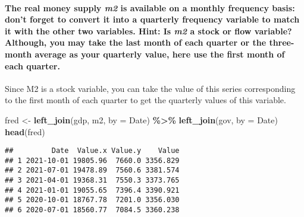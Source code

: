 \documentclass[
]{article}
\newenvironment{Shaded}{\begin{snugshade}}{\end{snugshade}}
\newcommand{\AttributeTok}[1]{\textcolor[rgb]{0.13,0.29,0.53}{#1}}
\newcommand{\FunctionTok}[1]{\textcolor[rgb]{0.13,0.29,0.53}{\textbf{#1}}}
\newcommand{\NormalTok}[1]{#1}
\newcommand{\OtherTok}[1]{\textcolor[rgb]{0.56,0.35,0.01}{#1}}
\newcommand{\SpecialCharTok}[1]{\textcolor[rgb]{0.81,0.36,0.00}{\textbf{#1}}}
\newcommand{\StringTok}[1]{\textcolor[rgb]{0.31,0.60,0.02}{#1}}
\begin{document}
\hypertarget{the-real-money-supply-m2-is-available-on-a-monthly-frequency-basis-dont-forget-to-convert-it-into-a-quarterly-frequency-variable-to-match-it-with-the-other-two-variables.-hint-is-m2-a-stock-or-flow-variable-although-you-may-take-the-last-month-of-each-quarter-or-the-three-month-average-as-your-quarterly-value-here-use-the-first-month-of-each-quarter.}{%
\paragraph{\texorpdfstring{The real money supply \emph{m2} is available
on a monthly frequency basis: don't forget to convert it into a
quarterly frequency variable to match it with the other two variables.
Hint: Is \emph{m2} a stock or flow variable? Although, you may take the
last month of each quarter or the three-month average as your quarterly
value, here use the first month of each
quarter.}{The real money supply m2 is available on a monthly frequency basis: don't forget to convert it into a quarterly frequency variable to match it with the other two variables. Hint: Is m2 a stock or flow variable? Although, you may take the last month of each quarter or the three-month average as your quarterly value, here use the first month of each quarter.}}\label{the-real-money-supply-m2-is-available-on-a-monthly-frequency-basis-dont-forget-to-convert-it-into-a-quarterly-frequency-variable-to-match-it-with-the-other-two-variables.-hint-is-m2-a-stock-or-flow-variable-although-you-may-take-the-last-month-of-each-quarter-or-the-three-month-average-as-your-quarterly-value-here-use-the-first-month-of-each-quarter.}}

Since M2 is a stock variable, you can take the value of this series
corresponding to the first month of each quarter to get the quarterly
values of this variable.

\begin{Shaded}
\begin{Highlighting}[]
\NormalTok{fred }\OtherTok{\textless{}{-}} \FunctionTok{left\_join}\NormalTok{(gdp, m2, }\AttributeTok{by =} \StringTok{\textquotesingle{}Date\textquotesingle{}}\NormalTok{) }\SpecialCharTok{\%\textgreater{}\%}
  \FunctionTok{left\_join}\NormalTok{(gov, }\AttributeTok{by =} \StringTok{\textquotesingle{}Date\textquotesingle{}}\NormalTok{)}
\FunctionTok{head}\NormalTok{(fred)}
\end{Highlighting}
\end{Shaded}

\begin{verbatim}
##         Date  Value.x Value.y    Value
## 1 2021-10-01 19805.96  7660.0 3356.829
## 2 2021-07-01 19478.89  7560.6 3381.574
## 3 2021-04-01 19368.31  7550.3 3373.765
## 4 2021-01-01 19055.65  7396.4 3390.921
## 5 2020-10-01 18767.78  7201.0 3356.030
## 6 2020-07-01 18560.77  7084.5 3360.238
\end{verbatim}
\end{document}

